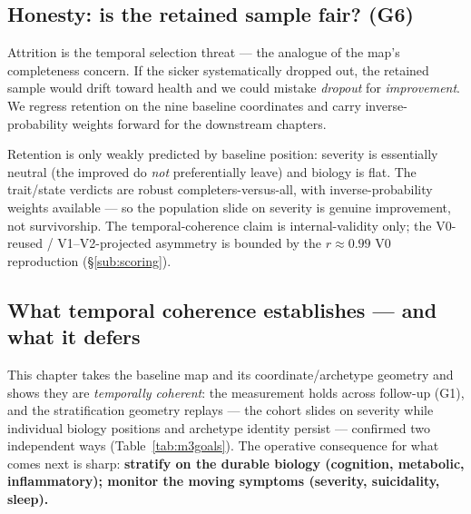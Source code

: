 \subsection{Honesty: is the retained sample fair? (G6)}
Attrition is the temporal selection threat --- the analogue of the map's completeness concern. If the sicker
systematically dropped out, the retained sample would drift toward health and we could mistake \emph{dropout}
for \emph{improvement}. We regress retention on the nine baseline coordinates and carry inverse-probability
weights forward for the downstream chapters.

\begin{keyresult}
Retention is only weakly predicted by baseline position: severity is essentially neutral (the improved do
\emph{not} preferentially leave) and biology is flat. The trait/state verdicts are robust completers-versus-all,
with inverse-probability weights available --- so the population slide on severity is genuine improvement, not
survivorship. The temporal-coherence claim is internal-validity only; the V0-reused / V1--V2-projected asymmetry
is bounded by the $r\approx0.99$ V0 reproduction (\S\ref{sub:scoring}).
\end{keyresult}

\subsection{What temporal coherence establishes --- and what it defers}
This chapter takes the baseline map and its coordinate/archetype geometry and shows they are \emph{temporally coherent}: the measurement holds
across follow-up (G1), and the stratification geometry replays --- the cohort slides on severity while
individual biology positions and archetype identity persist --- confirmed two independent ways
(Table~\ref{tab:m3goals}). The operative consequence for what comes next is sharp:
\textbf{stratify on the durable biology (cognition, metabolic, inflammatory); monitor the moving symptoms
(severity, suicidality, sleep).}

